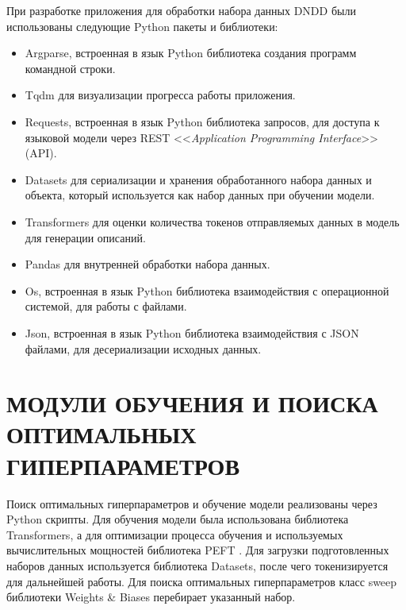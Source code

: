 При разработке приложения для обработки набора данных DNDD были использованы следующие Python пакеты и библиотеки:
\begin{itemize}
    \item Argparse, встроенная в язык Python библиотека создания программ командной строки.
    \item Tqdm \cite{tqdm-docs} для визуализации прогресса работы приложения.
    \item Requests, встроенная в язык Python библиотека запросов, для доступа к языковой модели через REST <<\textit{Application Programming Interface}>> (API).
    \item Datasets \cite{hf-datasets-docs} для сериализации и хранения обработанного набора данных и объекта, который используется как набор данных при обучении модели.
    \item Transformers \cite{transformers-docs} для оценки количества токенов отправляемых данных в модель для генерации описаний.
    \item Pandas \cite{pandas-docs} для внутренней обработки набора данных.
    \item Os, встроенная в язык Python библиотека взаимодействия с операционной системой, для работы с файлами.
    \item Json, встроенная в язык Python библиотека взаимодействия с JSON файлами, для десериализации исходных данных.
\end{itemize}

\section{МОДУЛИ ОБУЧЕНИЯ И ПОИСКА ОПТИМАЛЬНЫХ ГИПЕРПАРАМЕТРОВ}
Поиск оптимальных гиперпараметров и обучение модели реализованы через Python скрипты. Для обучения модели была использована библиотека Transformers, а для оптимизации процесса обучения и используемых вычислительных мощностей библиотека PEFT \cite{peft-docs}. Для загрузки подготовленных наборов данных используется библиотека Datasets, после чего токенизируется для дальнейшей работы. Для поиска оптимальных гиперпараметров класс sweep библиотеки Weights \& Biases \cite{wandb-docs} перебирает указанный набор.